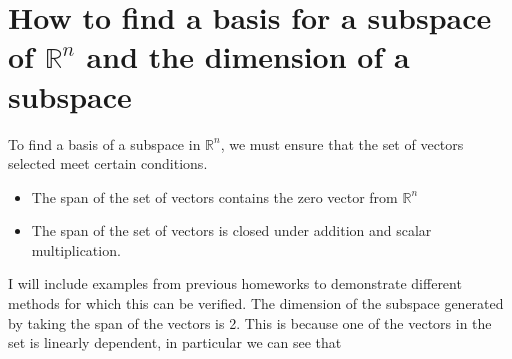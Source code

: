 \documentclass{report}
\begin{document}
\section{How to find a basis for a subspace of $\mathbb{R}^n$ and the dimension of a subspace}
\noindent To find a basis of a subspace in $\mathbb{R}^n$,  we must ensure that the set of vectors selected meet certain conditions.
\begin{itemize}
\item The span of the set of vectors contains the zero vector from $\mathbb{R}^n$
\item The span of the set of vectors is closed under addition and scalar multiplication.
\end{itemize}
I will include examples from previous homeworks to demonstrate different methods for which this can be verified. 
\sol The dimension of the subspace generated by taking the span of the vectors is 2. This is because one of the vectors in the set is linearly dependent, in particular we can see that
\end{document}

